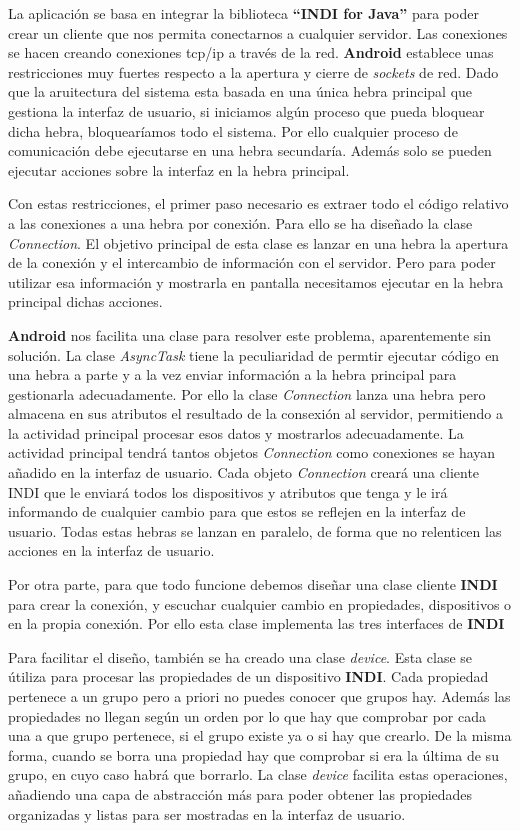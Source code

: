 La aplicación se basa en integrar la biblioteca \textbf{``INDI for Java''} para poder crear un cliente que nos permita conectarnos a cualquier servidor. Las conexiones se hacen creando conexiones tcp/ip a través de la red. \textbf{Android} establece unas restricciones muy fuertes respecto a la apertura y cierre de \textit{sockets} de red. Dado que la aruitectura del sistema esta basada en una única hebra principal que gestiona la interfaz de usuario, si iniciamos algún proceso que pueda bloquear dicha hebra, bloquearíamos todo el sistema. Por ello cualquier proceso de comunicación debe ejecutarse en una hebra secundaría. Además solo se pueden ejecutar acciones sobre la interfaz en la hebra principal.

\bigskip
Con estas restricciones, el primer paso necesario es extraer todo el código relativo a las conexiones a una hebra por conexión. Para ello se ha diseñado la clase \textit{Connection}. El objetivo principal de esta clase es lanzar en una hebra la apertura de la conexión y el intercambio de información con el servidor. Pero para poder utilizar esa información y mostrarla en pantalla necesitamos ejecutar en la hebra principal dichas acciones. 

\bigskip
\textbf{Android} nos facilita una clase para resolver este problema, aparentemente sin solución. La clase \textit{AsyncTask} tiene la peculiaridad de permtir ejecutar código en una hebra a parte y a la vez enviar información a la hebra principal para gestionarla adecuadamente. Por ello la clase \textit{Connection} lanza una hebra pero almacena en sus atributos el resultado de la consexión al servidor, permitiendo a la actividad principal procesar esos datos y mostrarlos adecuadamente. La actividad principal tendrá tantos objetos \textit{Connection} como conexiones se hayan añadido en la interfaz de usuario. Cada objeto \textit{Connection} creará una cliente INDI que le enviará todos los dispositivos y atributos que tenga y le irá informando de cualquier cambio para que estos se reflejen en la interfaz de usuario. Todas estas hebras se lanzan en paralelo, de forma que no relenticen las acciones en la interfaz de usuario.

\bigskip
Por otra parte, para que todo funcione debemos diseñar una clase cliente \textbf{INDI} para crear la conexión, y escuchar cualquier cambio en propiedades, dispositivos o en la propia conexión. Por ello esta clase implementa las tres interfaces de \textbf{INDI}

\bigskip
Para facilitar el diseño, también se ha creado una clase \textit{device}. Esta clase se útiliza para procesar las propiedades de un dispositivo \textbf{INDI}. Cada propiedad pertenece a un grupo pero a priori no puedes conocer que grupos hay. Además las propiedades no llegan según un orden por lo que hay que comprobar por cada una a que grupo pertenece, si el grupo existe ya o si hay que crearlo. De la misma forma, cuando se borra una propiedad hay que comprobar si era la última de su grupo, en cuyo caso habrá que borrarlo. La clase \textit{device} facilita estas operaciones, añadiendo una capa de abstracción más para poder obtener las propiedades organizadas y listas para ser mostradas en la interfaz de usuario.

